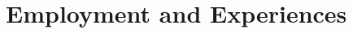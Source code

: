 \documentclass[11pt,a4paper,scan]{moderncv}        %
\begin{document}



\renewcommand{\refname}{Publications}
\renewcommand{\bibliographyitemlabel}{\@{\arabic{enumiv}}}
\nocite{*}

  





\section{Employment and Experiences}

\vspace{6pt}
\end{document}
